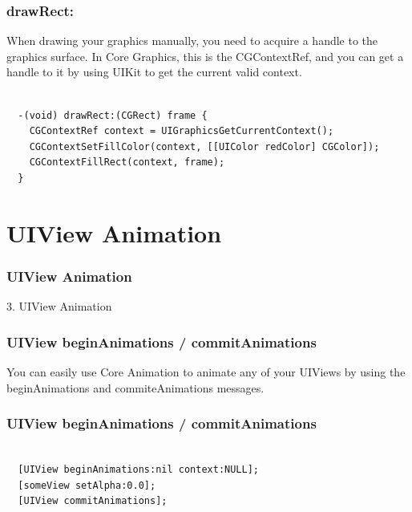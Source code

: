 \documentclass[10pt]{beamer}
\begin{document}
\begin{frame}[fragile]
  \frametitle{drawRect:}
  When drawing your graphics manually, you need to acquire a handle to the graphics surface.  In Core Graphics, this is the CGContextRef, and you can get a handle to it by using UIKit to get the current valid context.
\begin{listing}[H]
    \begin{verbatim}

  -(void) drawRect:(CGRect) frame {
    CGContextRef context = UIGraphicsGetCurrentContext();
    CGContextSetFillColor(context, [[UIColor redColor] CGColor]);
    CGContextFillRect(context, frame);
  }

  \end{verbatim}
    \caption{Core Graphics context}
    \label{listing:33}
  \end{listing}

\end{frame}

    

   
  

  
    
\section{UIView Animation}
\begin{frame}[fragile]
  \frametitle{UIView Animation}
  3. UIView Animation
\end{frame}


    
\begin{frame}[fragile]
  \frametitle{UIView beginAnimations / commitAnimations}
  You can easily use Core Animation to animate any of your UIViews by using the beginAnimations  and commiteAnimations messages.

\end{frame}

\begin{frame}[fragile]
  \frametitle{UIView beginAnimations / commitAnimations}
  \begin{listing}[H]
    \begin{verbatim}

  [UIView beginAnimations:nil context:NULL];
  [someView setAlpha:0.0];
  [UIView commitAnimations];

  \end{verbatim}
    \caption{Example animation}
    \label{listing:34}
  \end{listing}

\end{frame}
\end{document}
